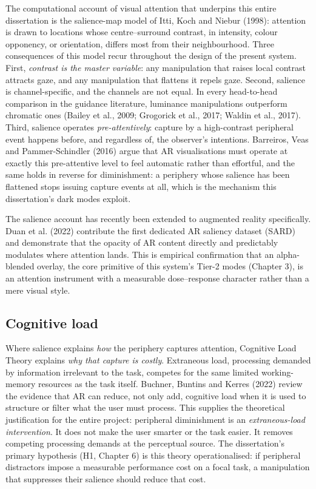 The computational account of visual attention that underpins this entire dissertation is the
salience-map model of Itti, Koch and Niebur (1998): attention is drawn to locations whose
centre–surround contrast, in intensity, colour opponency, or orientation, differs most from their
neighbourhood. Three consequences of this model recur throughout the design of the present system.
First, \textit{contrast is the master variable}: any manipulation that raises local contrast attracts gaze,
and any manipulation that flattens it repels gaze. Second, salience is channel-specific, and the
channels are not equal. In every head-to-head comparison in the guidance literature, luminance
manipulations outperform chromatic ones (Bailey et al., 2009; Grogorick et al., 2017; Waldin et al.,
2017). Third, salience operates \textit{pre-attentively}: capture by a high-contrast peripheral event
happens before, and regardless of, the observer's intentions. Barreiros, Veas and Pammer-Schindler
(2016) argue that AR visualisations must operate at exactly this pre-attentive level to feel automatic
rather than effortful, and the same holds in reverse for diminishment: a periphery whose salience has
been flattened stops issuing capture events at all, which is the mechanism this dissertation's dark
modes exploit.

The salience account has recently been extended to augmented reality specifically. Duan et al. (2022)
contribute the first dedicated AR saliency dataset (SARD) and demonstrate that the opacity of AR
content directly and predictably modulates where attention lands. This is empirical confirmation that
an alpha-blended overlay, the core primitive of this system's Tier-2 modes (Chapter 3), is an
attention instrument with a measurable dose–response character rather than a mere visual style.

\subsection{Cognitive load}

Where salience explains \textit{how} the periphery captures attention, Cognitive Load Theory explains \textit{why
that capture is costly}. Extraneous load, processing demanded by information irrelevant to the task,
competes for the same limited working-memory resources as the task itself. Buchner, Buntins and
Kerres (2022) review the evidence that AR can reduce, not only add, cognitive load when it is used to
structure or filter what the user must process. This supplies the theoretical justification for the entire
project: peripheral diminishment is an \textit{extraneous-load intervention}. It does not make the user
smarter or the task easier. It removes competing processing demands at the perceptual source. The
dissertation's primary hypothesis (H1, Chapter 6) is this theory operationalised: if peripheral
distractors impose a measurable performance cost on a focal task, a manipulation that suppresses
their salience should reduce that cost.

